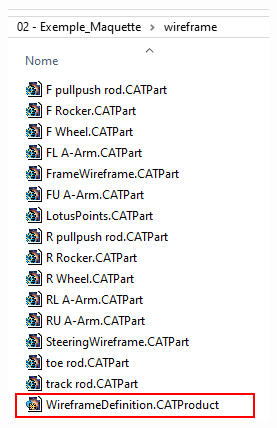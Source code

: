\begin{figure}
\begin{subfigure}{.3\textwidth}
        \includegraphics[width=\textwidth]{img/maj_file2.png}
    \end{subfigure}{}
    \begin{subfigure}{.3\textwidth}
        \centering

\end{subfigure}
\end{figure}
